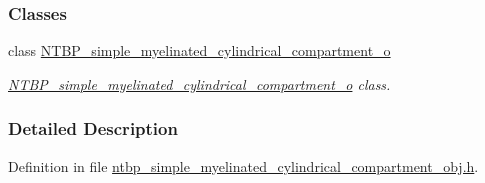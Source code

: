 \subsubsection*{Classes}
\begin{DoxyCompactItemize}
\item 
class \hyperlink{class_n_t_b_p__simple__myelinated__cylindrical__compartment__o}{NTBP\_\-simple\_\-myelinated\_\-cylindrical\_\-compartment\_\-o}
\begin{DoxyCompactList}\small\item\em \hyperlink{class_n_t_b_p__simple__myelinated__cylindrical__compartment__o}{NTBP\_\-simple\_\-myelinated\_\-cylindrical\_\-compartment\_\-o} class. \item\end{DoxyCompactList}\end{DoxyCompactItemize}


\subsubsection{Detailed Description}


Definition in file \hyperlink{ntbp__simple__myelinated__cylindrical__compartment__obj_8h_source}{ntbp\_\-simple\_\-myelinated\_\-cylindrical\_\-compartment\_\-obj.h}.

